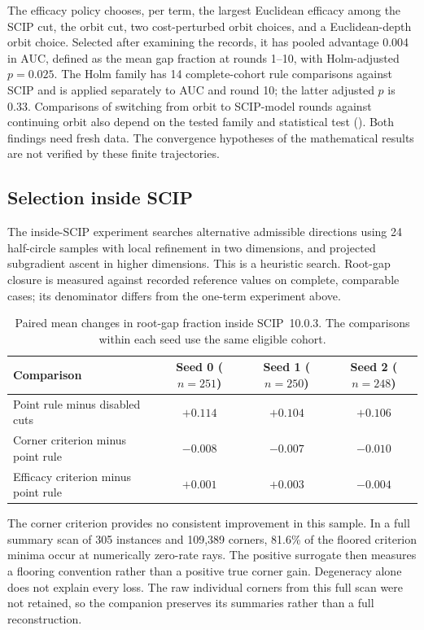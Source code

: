 The efficacy policy chooses, per term, the largest Euclidean efficacy
among the SCIP cut, the orbit cut, two cost-perturbed orbit choices, and
a Euclidean-depth orbit choice. Selected after examining the records,
it has pooled
advantage 0.004 in AUC, defined as the mean gap fraction at rounds 1--10,
with Holm-adjusted $p=0.025$. The Holm family has 14 complete-cohort rule
comparisons against SCIP and is applied separately to AUC and round 10;
the latter adjusted $p$ is 0.33. Comparisons of switching from orbit to
SCIP-model rounds against continuing orbit also depend on the tested
family and statistical test (). Both findings need fresh
data. The convergence hypotheses of the mathematical results are not
verified by these finite trajectories.

\subsection{Selection inside SCIP}
\label{exp:selection}

The inside-SCIP experiment searches alternative admissible directions
using 24 half-circle samples with local refinement in two dimensions,
and projected subgradient ascent in higher dimensions. This is a
heuristic search. Root-gap closure is measured against recorded reference
values on complete, comparable cases; its denominator differs from the
one-term experiment above.

\begin{table}[t]
\centering
\caption{Paired mean changes in root-gap fraction inside SCIP~10.0.3.
The comparisons within each seed use the same eligible cohort.}
\label{exp:root-table}
\begin{tabular}{@{}lccc@{}}
\toprule
Comparison & Seed 0 ($n=251$) & Seed 1 ($n=250$) & Seed 2 ($n=248$) \\
\midrule
Point rule minus disabled cuts & $+0.114$ & $+0.104$ & $+0.106$ \\
Corner criterion minus point rule & $-0.008$ & $-0.007$ & $-0.010$ \\
Efficacy criterion minus point rule & $+0.001$ & $+0.003$ & $-0.004$ \\
\bottomrule
\end{tabular}
\end{table}

The corner criterion provides no consistent improvement in this sample.
In a full summary scan of 305 instances and 109,389 corners, 81.6\% of
the floored criterion minima occur at numerically zero-rate rays. The
positive surrogate then measures a flooring convention rather than a
positive true corner gain. Degeneracy alone does not explain every loss.
The raw individual corners from this full scan were not retained, so
the companion preserves its summaries rather than a full reconstruction.

